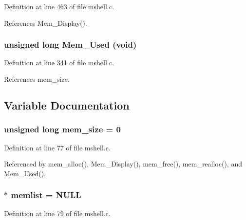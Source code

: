 Definition at line 463 of file mshell.c.

References Mem\_\-Display().
\subsubsection{\setlength{\rightskip}{0pt plus 5cm}unsigned long Mem\_\-Used (void)}\label{mshell_8c_a18}




Definition at line 341 of file mshell.c.

References mem\_\-size.

\subsection{Variable Documentation}
\subsubsection{\setlength{\rightskip}{0pt plus 5cm}unsigned long mem\_\-size = 0\hspace{0.3cm}{\tt  [static]}}\label{mshell_8c_a9}




Definition at line 77 of file mshell.c.

Referenced by mem\_\-alloc(), Mem\_\-Display(), mem\_\-free(), mem\_\-realloc(), and Mem\_\-Used().
\subsubsection{$\ast$ memlist = NULL\hspace{0.3cm}{\tt  [static]}}\label{mshell_8c_a10}




Definition at line 79 of file mshell.c.